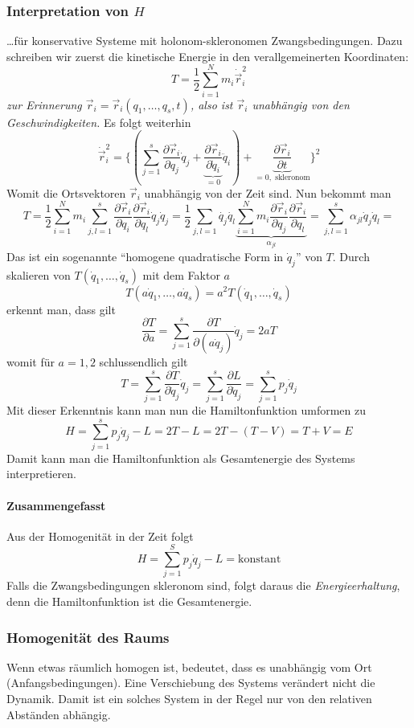 \documentclass[oneside]{book}
\theoremstyle{definition}
\newcommand{\ffpartial}[2]{\frac{\partial #1}{\partial #2}}
\newcommand{\dotvec}[1]{\dot{\vec{#1}}}
\newcommand{\const}{\text{konstant}}
\begin{document}
\subsubsection{Interpretation von $H$} \dots für konservative Systeme mit holonom-skleronomen Zwangsbedingungen.
Dazu schreiben wir zuerst die kinetische Energie in den verallgemeinerten Koordinaten:
$$T = \frac12 \sum_{i=1}^N m_i \dotvec{r}_i^2$$
\textit{zur Erinnerung $\vec{r}_i = \vec{r}_i(q_1, \dots, q_s, t)$, also ist $\vec{r}_i$ unabhängig von den Geschwindigkeiten.} Es folgt weiterhin
$$\dotvec{r}_i^2 = \{(\sum_{j=1}^s \ffpartial{\vec{r}_i}{q_j} \dot{q}_j + \underbrace{\ffpartial{\vec{r}_i}{\dot{q}_i}}_{=0} \ddot{q}_i) + \underbrace{\ffpartial{\vec{r}_i}{t}}_{=0, \text{ skleronom}}\}^2 $$
Womit die Ortsvektoren $\vec{r}_i$ unabhängig von der Zeit sind. Nun bekommt man
$$T = \frac12 \sum_{i=1}^N m_i \sum_{j,l=1}^{s} \ffpartial{\vec{r}_i}{q_i} \ffpartial{\vec{r}_i}{q_l} \dot{q}_j \dot{q}_j = \frac12 \sum_{j,l = 1}^{} \dot{q_j} \dot{q_l} \underbrace{\sum_{i=1}^N m_i \ffpartial{\vec{r}_i}{q_j} \ffpartial{\vec{r}_i}{q_l}}_{\alpha_{jl}} = \sum_{j,l=1}^s \alpha_{jl} \dot{q}_j \dot{q}_l = $$
Das ist ein sogenannte "`homogene quadratische Form in $\dot{q}_j$"' von $T$.
Durch skalieren von $T(\dot{q}_1, \dots, \dot{q}_s)$ mit dem Faktor $a$
$$T(a \dot{q}_1, \dots, a \dot{q}_s) = a^2 T(\dot{q}_1, \dots, \dot{q}_s)$$
erkennt man, dass gilt
$$\ffpartial{T}{a} = \sum_{j=1}^s \ffpartial{T}{(a \dot{q}_j)}\dot{q}_j = 2 a T$$
womit für $a = 1, 2$ schlussendlich  gilt
$$T = \sum_{j=1}^s \ffpartial{T}{\dot{q}_j} \dot{q}_j = \sum_{j=1}^s \ffpartial{L}{\dot{q}_j} = \sum_{j=1}^s p_j \dot{q}_j$$
Mit dieser Erkenntnis kann man nun die Hamiltonfunktion umformen zu
$$H = \sum_{j=1}^s p_j \dot{q}_j - L = 2T - L = 2 T - (T-V) = T + V = E$$
Damit kann man die Hamiltonfunktion als Gesamtenergie des Systems interpretieren.






\paragraph{Zusammengefasst}
Aus der Homogenität in der Zeit folgt
\[H=\sum\limits_{j=1}^S p_j\dot q_j - L = \const\]
Falls die Zwangsbedingungen skleronom sind, folgt daraus die \emph{Energieerhaltung}, denn die Hamiltonfunktion ist die Gesamtenergie.

\subsubsection{Homogenität des Raums}
Wenn etwas räumlich homogen ist, bedeutet, dass es unabhängig vom Ort (Anfangsbedingungen). Eine Verschiebung des Systems verändert nicht die Dynamik. Damit ist ein solches System in der Regel nur von den relativen Abständen abhängig.
\end{document}
